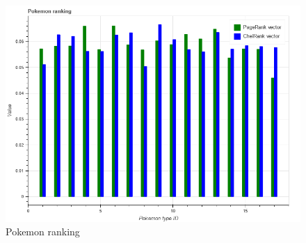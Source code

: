 \documentclass[12pt]{article}
\begin{document}
\begin{figure}[ht]
    \centering
    \includegraphics[width=\textwidth]{images/pokerank.png}
    \caption{Pokemon ranking}
    \label{fig:pokerank}
\end{figure}
\end{document}
